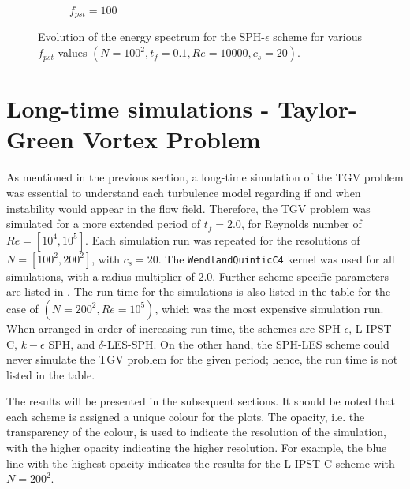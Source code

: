 \begin{figure}[htbp!]
\begin{subfigure}{7cm}
  \caption{$f_{pst} = 100$}
  \end{subfigure}
  \caption{Evolution of the energy spectrum for the SPH-$\epsilon$ scheme for various $f_{pst}$ values $(N=100^2, t_f=0.1, Re=10000, c_s=20)$.}
  \label{fig:sph-eps-pst-espec}
\end{figure}

\section{Long-time simulations - Taylor-Green Vortex Problem}
As mentioned in the previous section, a long-time simulation of the TGV problem was essential to understand each turbulence model regarding if and when instability would appear in the flow field.
Therefore, the TGV problem was simulated for a more extended period of $t_f = 2.0$, for Reynolds number of $Re=[10^4, 10^5]$. Each simulation run was repeated for the resolutions of $N=[100^2, 200^2]$, with $c_s=20$. The \texttt{WendlandQuinticC4} kernel was used for all simulations, with a radius multiplier of $2.0$. 
Further scheme-specific parameters are listed in .
The run time for the simulations is also listed in the table for the case of $(N=200^2, Re=10^5)$, which was the most expensive simulation run.
When arranged in order of increasing run time, the schemes are SPH-$\epsilon$, L-IPST-C, $k-\epsilon$ SPH, and $\delta$-LES-SPH.
On the other hand, the SPH-LES scheme could never simulate the TGV problem for the given period; hence, the run time is not listed in the table.

The results will be presented in the subsequent sections. It should be noted that each scheme is assigned a unique colour for the plots. The opacity, i.e. the transparency of the colour, is used to indicate the resolution of the simulation, with the higher opacity indicating the higher resolution. For example, the blue line with the highest opacity indicates the results for the L-IPST-C scheme with $N=200^2$.


